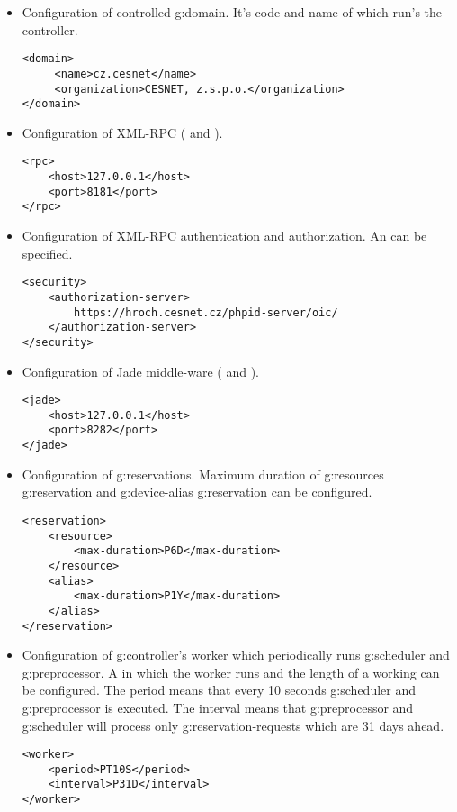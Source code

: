 \begin{itemize}
\item Configuration of controlled \gls{g:domain}. It's code  and name of  which run's the
controller.
\begin{verbatim}
<domain>
     <name>cz.cesnet</name>
     <organization>CESNET, z.s.p.o.</organization>
</domain>
\end{verbatim}

\item Configuration of XML-RPC ( and ).
\begin{verbatim}
<rpc>
    <host>127.0.0.1</host>
    <port>8181</port>
</rpc>
\end{verbatim}

\item Configuration of XML-RPC authentication and authorization. An  can be specified.
\begin{verbatim}
<security>
    <authorization-server>
        https://hroch.cesnet.cz/phpid-server/oic/
    </authorization-server>
</security>
\end{verbatim}

\item Configuration of Jade middle-ware ( and ).
\begin{verbatim}
<jade>
    <host>127.0.0.1</host>
    <port>8282</port>
</jade>
\end{verbatim}

\item Configuration of \glspl{g:reservation}. Maximum duration of \glspl{g:resource} \gls{g:reservation} and \gls{g:device-alias} \gls{g:reservation} can be configured.
\begin{verbatim}
<reservation>
    <resource>
        <max-duration>P6D</max-duration>
    </resource>
    <alias>
        <max-duration>P1Y</max-duration>
    </alias>
</reservation>
\end{verbatim}

\item Configuration of \gls{g:controller}'s worker which periodically runs \gls{g:scheduler} and \gls{g:preprocessor}. A  in which the worker runs and the length of a working  can be configured. The  period means that every 10 seconds \gls{g:scheduler} and \gls{g:preprocessor} is executed. The  interval means that \gls{g:preprocessor} and \gls{g:scheduler} will process only \glspl{g:reservation-request} which are 31 days ahead.
\begin{verbatim}
<worker>
    <period>PT10S</period>
    <interval>P31D</interval>
</worker>
\end{verbatim}


\end{itemize}
